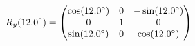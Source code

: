 \documentclass[preview]{standalone}
\begin{document}
\begin{align*}
\special{dvisvgm:raw <g id='unique000'>}R_y(12.0^\circ) = \begin{pmatrix} \cos(12.0^\circ) & 0 & -\sin(12.0^\circ) \\ 0 & 1 & 0 \\ \sin(12.0^\circ) & 0 & \cos(12.0^\circ) \end{pmatrix}\special{dvisvgm:raw </g>}
\end{align*}
\end{document}
